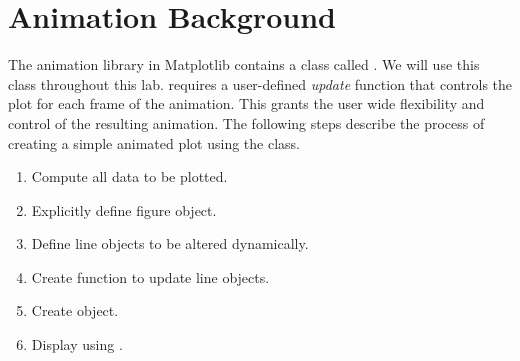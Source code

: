 \section*{Animation Background}
The animation library in Matplotlib contains a class called .
We will use this class throughout this lab.  requires a user-defined \textit{update} function that controls the plot for each frame of the animation. 
This grants the user wide flexibility and control of the resulting animation.
The following steps describe the process of creating a simple animated plot using the  class. 
\begin{enumerate}
\item Compute all data to be plotted.
\item Explicitly define figure object.
\item Define line objects to be altered dynamically.
\item Create function to update line objects.
\item Create  object.
\item Display using .
\end{enumerate}

